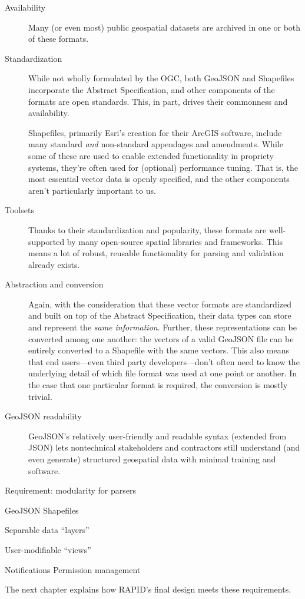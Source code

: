 \begin{description}
  \item[Availability] Many (or even most) public geospatial datasets are archived in one or both of these formats.
  \item[Standardization] While not wholly formulated by the OGC, both GeoJSON and Shapefiles incorporate the Abstract Specification, and other components of the formats are open standards. This, in part, drives their commonness and availability.
  
Shapefiles, primarily Esri's creation for their ArcGIS software, include many standard \textit{and} non-standard appendages and amendments. While some of these are used to enable extended functionality in propriety systems, they're often used for (optional) performance tuning. That is, the most essential vector data is openly specified, and the other components aren't particularly important to us.

\item[Toolsets] Thanks to their standardization and popularity, these formats  are well-supported by many open-source spatial libraries and frameworks. This means a lot of robust, reusable functionality for parsing and validation already exists.

\item[Abstraction and conversion] Again, with the consideration that these vector formats are standardized and built on top of the Abstract Specification, their data types can store and represent the \textit{same information}. Further, these representations can be converted among one another: the vectors of a valid GeoJSON file can be entirely converted to a Shapefile with the same vectors. This also means that end users---even third party developers---don't often need to know the underlying detail of which file format was used at one point or another. In the case that one particular format is required, the conversion is mostly trivial.

\item[GeoJSON readability] GeoJSON's relatively user-friendly and readable syntax (extended from JSON) lets nontechnical stakeholders and contractors still understand (and even generate) structured geospatial data with minimal training and software.

\end{description}



Requirement: modularity for parsers




GeoJSON
Shapefiles


Separable data ``layers''

User-modifiable ``views''


Notifications
Permission management


The next chapter explains how RAPID's final design meets these requirements.

